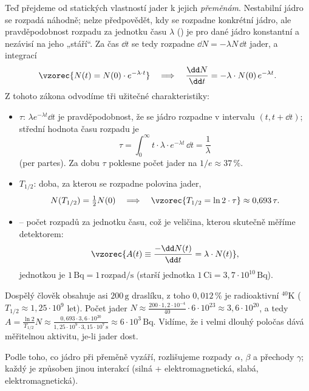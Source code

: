 Teď přejdeme od statických vlastností jader k jejich \emph{přeměnám}. Nestabilní jádro se rozpadá náhodně; nelze
předpovědět, kdy se rozpadne konkrétní jádro, ale pravděpodobnost rozpadu za jednotku času \(\lambda\)
() je pro dané jádro konstantní a nezávisí na jeho „stáří“. Za čas \(\dd t\) se tedy rozpadne
\(\dd N = -\lambda N\,\dd t\) jader, a integrací
\[
  \vzorec{N(t) = N(0)\cdot e^{-\lambda \cdot t}}
  \quad\Longrightarrow\quad
  \frac{\dd N}{\dd t} = -\lambda\cdot N(0)\, e^{-\lambda t} .
\]
Z tohoto zákona odvodíme tři užitečné charakteristiky:
\begin{itemize}
  \item {} \(\tau\): \(\lambda e^{-\lambda t}\dd t\) je pravděpodobnost, že se jádro rozpadne
  v intervalu \((t, t+\dd t)\); střední hodnota času rozpadu je
  \[
    \tau = \int_0^\infty t\cdot \lambda\cdot e^{-\lambda t}\,\dd t = \frac{1}{\lambda}
  \]
  (per partes). Za dobu \(\tau\) poklesne počet jader na \(1/e \approx 37\,\%\).
  \item {} \(T_{1/2}\): doba, za kterou se rozpadne polovina jader,
  \[
    N(T_{1/2}) = \tfrac12 N(0) \quad\Longrightarrow\quad \vzorec{T_{1/2} = \ln 2\cdot\tau} \approx 0{,}693\,\tau .
  \]
  \item {} -- počet rozpadů za jednotku času, což je veličina, kterou skutečně měříme detektorem:
  \[
    \vzorec{A(t) \equiv \frac{-\dd N(t)}{\dd t} = \lambda\cdot N(t)} ,
  \]
  jednotkou je  \(1\,\mathrm{Bq} = 1\,\text{rozpad/s}\) (starší jednotka \(1\,\mathrm{Ci}=3{,}7\cdot10^{10}\,\mathrm{Bq}\)).
\end{itemize}

\begin{priklad}
Dospělý člověk obsahuje asi \(200\,\mathrm{g}\) draslíku, z toho \(0{,}012\,\%\) je radioaktivní \({}^{40}\mathrm{K}\)
(\(T_{1/2}\approx 1{,}25\cdot10^9\) let). Počet jader \(N \approx \frac{200\cdot1{,}2\cdot10^{-4}}{40}\cdot 6\cdot10^{23}
\approx 3{,}6\cdot10^{20}\), a tedy
\(A = \frac{\ln2}{T_{1/2}}N \approx \frac{0{,}693\cdot3{,}6\cdot10^{20}}{1{,}25\cdot10^9\cdot3{,}15\cdot10^7\,\mathrm{s}} \approx 6\cdot10^3\,\mathrm{Bq}\).
Vidíme, že i velmi dlouhý poločas dává měřitelnou aktivitu, je-li jader dost.
\end{priklad}

Podle toho, co jádro při přeměně vyzáří, rozlišujeme rozpady \(\alpha\), \(\beta\) a přechody \(\gamma\); každý je
způsoben jinou interakcí (silná + elektromagnetická, slabá, elektromagnetická).

